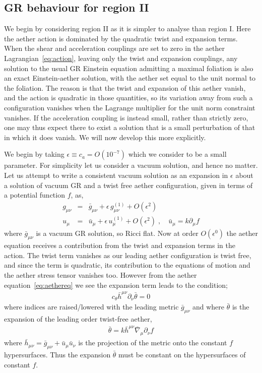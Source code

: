 \documentclass[12pt]{article}
\numberwithin{equation}{section}
\newcommand{\nl}{\nonumber \\}
\begin{document}
\subsection{GR behaviour for region II}
\label{sec:paintingII}

We begin by considering region II as it is simpler to analyse than region I. Here the aether action is dominated by the quadratic twist and expansion terms. 
%
When the shear and acceleration couplings are set to zero in the 
aether Lagrangian~\eqref{eq:action}, leaving only the twist and expansion couplings,
any solution to the usual GR Einstein equation admitting a maximal foliation
is also an exact Einstein-aether solution, with the aether set
equal to the unit normal to the foliation. The reason is that
the twist and expansion of this aether vanish, 
and the action is quadratic in those quantities, 
so its variation 
away from such a configuration vanishes when the Lagrange multiplier for the unit norm constraint vanishes.
If the acceleration 
coupling is instead small, rather than
strictly zero, one may thus expect there to exist a solution that is a small perturbation of that in which it does vanish. 
We will now develop this more explicitly.
%


We begin by taking $\epsilon \equiv c_a = O(10^{-7})$ which we consider to be a small parameter.
For simplicity let us consider a vacuum solution, and hence no matter. 
Let us attempt to write a consistent vacuum solution 
as an expansion in $\epsilon$ about a solution of vacuum GR and a twist free aether configuration, given in terms of a potential function $f$, as,
\begin{eqnarray}
\label{eq:GRbehaviour}
g_{\mu\nu} & = & \bar{g}_{\mu\nu} + \epsilon \,  g^{(1)}_{\mu\nu} + O(\epsilon^2) \nl
u_\mu & = & \bar{u}_\mu + \epsilon \, u^{(1)}_{\mu} + O(\epsilon^2) \; , \quad \bar{u}_\mu = k \partial_\mu f
\end{eqnarray}
where $\bar{g}_{\mu\nu}$ is a vacuum GR solution, so Ricci flat. Now at order $O(\epsilon^0)$ the aether equation receives a contribution from the twist and expansion terms in the action. The twist term vanishes as our leading aether configuration is twist free, and since the term is  quadratic, its contribution to the equations of motion and the aether stress tensor vanishes too. However from the aether equation~\eqref{eq:aethereq} we see the expansion term leads to the condition;
\begin{eqnarray}
c_\theta \bar{h}^{\mu\nu} \partial_\nu \bar{\theta}  = 0
\end{eqnarray}
where indices are raised/lowered with the leading metric $\bar{g}_{\mu\nu}$ and 
where $\bar{\theta}$ is the expansion of the leading order twist-free aether,
\begin{eqnarray}
\bar{\theta} = k \bar{h}^{\mu\nu} \bar{\nabla}_\mu \partial_\nu f 
\end{eqnarray}
where $\bar{h}_{\mu\nu} = \bar{g}_{\mu\nu} + \bar{u}_\mu \bar{u}_\nu$ is the projection of the metric onto the constant $f$ hypersurfaces. Thus the expansion $\bar{\theta}$ must be constant on the hypersurfaces of constant $f$. 
\end{document}
